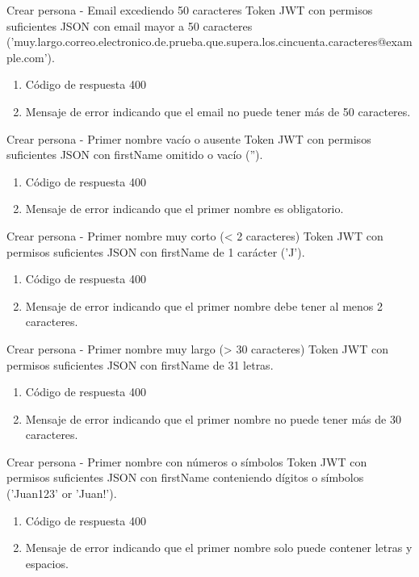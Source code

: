 {Crear persona - Email excediendo 50 caracteres}
{Token JWT con permisos suficientes}
{JSON con email mayor a 50 caracteres ('muy.largo.correo.electronico.de.prueba.que.supera.los.cincuenta.caracteres@example.com').}
{\begin{enumerate} [leftmargin=*, nosep]
    \item Código de respuesta 400
    \item Mensaje de error indicando que el email no puede tener más de 50 caracteres.
\end{enumerate}}

{Crear persona - Primer nombre vacío o ausente}
{Token JWT con permisos suficientes}
{JSON con firstName omitido o vacío ('').}
{\begin{enumerate} [leftmargin=*, nosep]
    \item Código de respuesta 400
    \item Mensaje de error indicando que el primer nombre es obligatorio.
\end{enumerate}}

{Crear persona - Primer nombre muy corto (< 2 caracteres)}
{Token JWT con permisos suficientes}
{JSON con firstName de 1 carácter ('J').}
{\begin{enumerate} [leftmargin=*, nosep]
    \item Código de respuesta 400
    \item Mensaje de error indicando que el primer nombre debe tener al menos 2 caracteres.
\end{enumerate}}

{Crear persona - Primer nombre muy largo (> 30 caracteres)}
{Token JWT con permisos suficientes}
{JSON con firstName de 31 letras.}
{\begin{enumerate} [leftmargin=*, nosep]
    \item Código de respuesta 400
    \item Mensaje de error indicando que el primer nombre no puede tener más de 30 caracteres.
\end{enumerate}}

{Crear persona - Primer nombre con números o símbolos}
{Token JWT con permisos suficientes}
{JSON con firstName conteniendo dígitos o símbolos ('Juan123' or 'Juan!').}
{\begin{enumerate} [leftmargin=*, nosep]
    \item Código de respuesta 400
    \item Mensaje de error indicando que el primer nombre solo puede contener letras y espacios.
\end{enumerate}}

